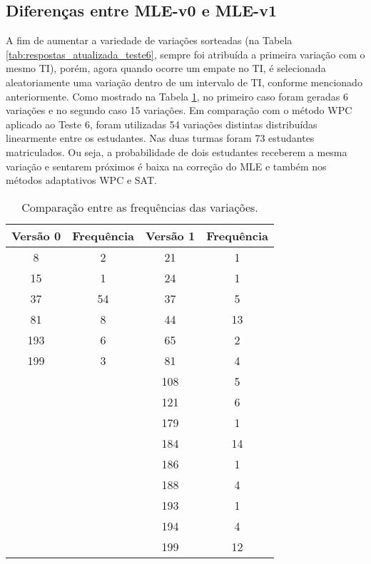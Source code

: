\subsection{Diferenças entre MLE-v0 e  MLE-v1}

A fim de aumentar a variedade de variações sorteadas (na Tabela \ref{tab:respostas_atualizada_teste6}, sempre foi atribuída a primeira variação com o mesmo TI), porém, agora quando ocorre um empate no TI, é selecionada aleatoriamente uma variação dentro de um intervalo de TI, conforme mencionado anteriormente. Como mostrado na Tabela \ref{tab:MLE_frequencias}, no primeiro caso foram geradas 6 variações e no segundo caso 15 variações. Em comparação com o método WPC aplicado ao Teste 6, foram utilizadas 54 variações distintas distribuídas linearmente entre os estudantes. Nas duas turmas foram 73 estudantes matriculados. Ou seja, a probabilidade de dois estudantes receberem a mesma variação e sentarem próximos é baixa na correção do MLE e também nos métodos adaptativos WPC e SAT.

\begin{table}[htbp]
    \centering
    \caption{Comparação entre as frequências das variações.}
    \label{tab:MLE_frequencias}
    \begin{tabular}{|c|c|c|c|}
        \hline
        \cellcolor{green!25} \textbf{Versão 0} & \cellcolor{green!25} \textbf{Frequência} & \cellcolor{yellow!25} \textbf{Versão 1} & \cellcolor{yellow!25} \textbf{Frequência} \\
        \hline
        8 & 2 & 21 & 1 \\
        15 & 1 & 24 & 1 \\
        37 & 54 & 37 & 5 \\
        81 & 8 & 44 & 13 \\
        193 & 6 & 65 & 2 \\
        199 & 3 & 81 & 4 \\
        & & 108 & 5 \\
        & & 121 & 6 \\
        & & 179 & 1 \\
        & & 184 & 14 \\
        & & 186 & 1 \\
        & & 188 & 4 \\
        & & 193 & 1 \\
        & & 194 & 4 \\
        & & 199 & 12 \\
        \hline
    \end{tabular}
\end{table}

